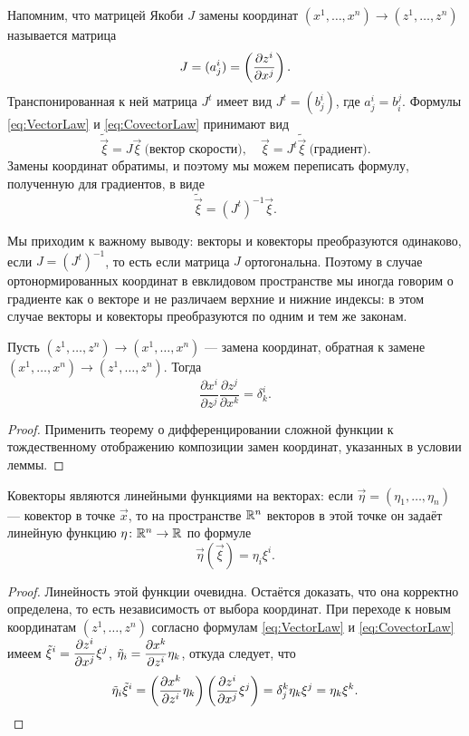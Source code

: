 Напомним, что матрицей Якоби $J$ замены координат $(x^1, \ldots, x^n) \to (z^1, \ldots, z^n)$ называется матрица
\[
	J = (a^i_j) = \left(\frac{\partial z^i}{\partial x^j}\right).
\]
Транспонированная к ней матрица $J^t$ имеет вид $J^t = (b^i_j)$, где $a^i_j = b^j_i$. Формулы \eqref{eq:VectorLaw} и \eqref{eq:CovectorLaw} принимают вид
\[
	\tilde{\vec{\xi}} = J\vec{\xi}\ \text{(вектор скорости)},\quad\vec{\xi} = J^t\tilde{\vec{\xi}}\ \text{(градиент)}.
\]
Замены координат обратимы, и поэтому мы можем переписать формулу, полученную для градиентов, в виде
\[
	\tilde{\vec{\xi}} = (J^t)^{-1}\vec{\xi}.
\]

Мы приходим к важному выводу: векторы и ковекторы преобразуются одинаково, если $J = (J^t)^{-1}$, то есть если матрица $J$ ортогональна. Поэтому в случае ортонормированных координат в евклидовом пространстве мы иногда говорим о градиенте как о векторе и не различаем верхние и нижние индексы: в этом случае векторы и ковекторы преобразуются по одним и тем же законам.

\begin{lemma} \label{lemma:InverseCoordinates}
	Пусть $(z^1, \ldots, z^n) \to (x^1, \ldots, x^n)$ --- замена координат, обратная к замене $(x^1, \ldots, x^n) \to (z^1, \ldots, z^n)$. Тогда
	\begin{equation} \label{eq:InverseCoordinates}
		\frac{\partial x^i}{\partial z^j}\frac{\partial z^j}{\partial x^k} = \delta^i_k.
	\end{equation}
\end{lemma}

\begin{proof}
	Применить теорему о дифференцировании сложной функции к тождественному отображению композиции замен координат, указанных в условии леммы.
\end{proof}

\begin{theorem}
	Ковекторы являются линейными функциями на векторах: если $\vec{\eta} = (\eta_1, \ldots, \eta_n)$ --- ковектор в точке $\vec{x}$, то на пространстве $\mathbb{R}^n$ векторов в этой точке он задаёт линейную функцию $\eta\colon \mathbb{R}^n \to \mathbb{R}$ по формуле
	\[
		\vec{\eta}(\vec{\xi}) = \eta_i\xi^i.
	\]
\end{theorem}

\begin{proof}
	Линейность этой функции очевидна. Остаётся доказать, что она корректно определена, то есть независимость от выбора координат. При переходе к новым координатам $(z^1, \ldots, z^n)$ согласно формулам \eqref{eq:VectorLaw} и \eqref{eq:CovectorLaw} имеем $\displaystyle\tilde{\xi}^i = \frac{\partial z^i}{\partial x^j}\xi^j$, $\displaystyle\tilde{\eta}_i = \frac{\partial x^k}{\partial z^i}\eta_k$, откуда следует, что
	\[
		\tilde{\eta}_i\tilde{\xi}^i = \left(\frac{\partial x^k}{\partial z^i}\eta_k\right)\left(\frac{\partial z^i}{\partial x^j}\xi^j\right) = \delta_j^k\eta_k\xi^j = \eta_k\xi^k.
	\]
\end{proof}

